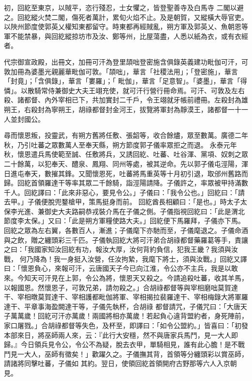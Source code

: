 \begin{pinyinscope}
 初，回紇至東京，以賊平，恣行殘忍，士女懼之，皆登聖善寺及白馬寺
 二閣以避之。回紇縱火焚二閣，傷死者萬計，累旬火焰不止。及是朝賀，又縱橫大辱官吏。以陜州節度使郭英乂權知東都留守。時東都再經賊亂，朔方軍及郭英乂、魚朝恩等軍不能禁暴，與回紇縱掠坊市及汝、鄭等州，比屋蕩盡，人悉以紙為衣，或有衣經者。



 代宗御宣政殿，出冊文，加冊可汗為登里頡咄登密施含俱錄英義建功毗伽可汗，可敦加冊為婆墨光親麗華毗伽可敦。「頡咄」，華言「社稷法用」；「登密施」，華言「封竟」；「含俱錄」，華言「婁羅」；「
 毗伽」，華言「足意智」。「婆墨」，華言「得憐」。以散騎常侍兼御史大夫王翊充使，就可汗行營行冊命焉。可汗、可敦及左右殺、諸都督、內外宰相已下，共加實封二千戶，令王翊就牙帳前禮冊。左殺封為雄朔王，右殺封為寧朔王，胡祿都督封金河王，拔覽將軍封為靜漠王，諸都督一十一人並封國公。



 尋而懷恩叛，投靈武，有朔方舊將任敷、張韶等，收合餘燼，眾至數萬。廣德二年秋，乃引吐蕃之眾數萬人至奉天縣，朔方節度郭子儀率眾拒之而退。
 永泰元年秋，懷恩遣兵馬使範至誠、任敷將兵，又誘回紇、吐蕃、吐谷渾、黨項、奴刺之眾二十餘萬，以犯奉天、醴泉、鳳翔、同州等處，被其逆命。先以郭子儀屯涇陽，渾日進屯奉天，數摧其鋒。又聞懷恩死，吐蕃將馬重英等十月初引退，取邠州舊路而歸。回紇首領羅達干等率其眾二千餘騎，詣涇陽請降。子儀許之，率眾被甲持滿數千人。回紇譯曰：「此來非惡心，要見令公。」子儀曰：「我令公也。」回紇曰：「請去甲。」子儀便脫兜鍪槍甲，策馬挺身而前。
 回紇酋長相顧曰：「是也。」時太子太保李光進、兼御史大夫路嗣恭戎裝介馬在子儀之側。子儀指視回紇曰：「此是渭北節度李太保。」又曰：「此是朔方軍糧使路大夫。」回紇便下馬羅拜，子儀亦下馬。回紇之眾為左右翼，各數百人，漸進；子儀麾下亦馳而至，子儀麾退之。子儀命酒與之飲，贈之纏頭彩三千匹。子儀執回紇大將可汗弟合胡祿都督藥羅葛等手，責讓之曰：「我國家知汝回紇有功，報汝大厚，汝何背約負信，犯我王畿？我須與汝戰，
 何乃降為！我一身挺入汝營，任汝拘縶，我麾下將士，須與汝戰。」回紇又譯曰：「懷恩負心，來報可汗，云唐國天子今已向江淮，令公亦不主兵，我是以敢來。今知天可汗見在上郭，令公為將，懷恩天又殺之。今請追殺吐蕃，收其羊馬，以報國恩。然懷恩子，可敦兄弟，請勿殺之。」合胡祿都督等與宰相磨咄莫賀達干、宰相暾莫賀達干、宰相護都毗伽將軍、宰相揭拉裴羅達干、宰相梅錄大將軍羅達干、平章事海盈闕達干等，子儀先執杯，合胡祿
 都督請咒，子儀咒曰：「大唐天子萬萬歲！回紇可汗亦萬歲！兩國將相亦萬歲！若起負心違背盟約者，身死陣前，家口屠戮。」合胡祿都督等失色，及杯至，即譯曰：「如令公盟約。」皆喜曰：「初發本部來日，將巫師兩人來，云：『此行大安穩，然不與唐家兵馬鬥，見一大人即歸。』今日領兵見令公，令公不為疑，脫去衣甲，單騎相見，誰有此心膽！是不戰鬥見一大人，巫師有徵矣！」歡躍久之。子儀撫其背，首領等分纏頭彩以賞巫師，請諸將同擊吐蕃，子儀如
 其約。翌日，使領回紇首領開府古野那等六人入京朝見。




\end{pinyinscope}
